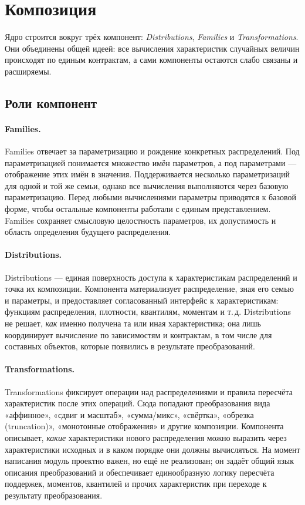 \section{Композиция}

\label{sec:composition}

Ядро строится вокруг трёх компонент: \textit{Distributions}, \textit{Families} и \textit{Transformations}. 
Они объединены общей идеей: все вычисления характеристик случайных величин происходят по единым контрактам, а сами компоненты остаются слабо связаны и расширяемы.

\subsection{Роли компонент}

\paragraph{Families.}
Families отвечает за параметризацию и рождение конкретных распределений. 
Под параметризацией понимается множество имён параметров, а под параметрами --- отображение этих имён в значения. 
Поддерживается несколько параметризаций для одной и той же семьи, однако все вычисления выполняются через базовую параметризацию. 
Перед любыми вычислениями параметры приводятся к базовой форме, чтобы остальные компоненты работали с единым представлением. 
Families сохраняет смысловую целостность параметров, их допустимость и область определения будущего распределения.

\paragraph{Distributions.}
Distributions --- единая поверхность доступа к характеристикам распределений и точка их композиции. 
Компонента материализует распределение, зная его семью и параметры, и предоставляет согласованный интерфейс к характеристикам: функциям распределения, плотности, квантилям, моментам и т.\,д. 
Distributions не решает, \emph{как} именно получена та или иная характеристика; она лишь координирует вычисление по зависимостям и контрактам, в том числе для составных объектов, которые появились в результате преобразований.

\paragraph{Transformations.}
Transformations фиксирует операции над распределениями и правила пересчёта характеристик после этих операций. 
Сюда попадают преобразования вида «аффинное», «сдвиг и масштаб», «сумма/микс», «свёртка», «обрезка (truncation)», «монотонные отображения» и другие композиции. 
Компонента описывает, \emph{какие} характеристики нового распределения можно выразить через характеристики исходных и в каком порядке они должны вычисляться.
На момент написания модуль проектно важен, но ещё не реализован; он задаёт общий язык описания преобразований и обеспечивает единообразную логику пересчёта поддержек, моментов, квантилей и прочих характеристик при переходе к результату преобразования.

